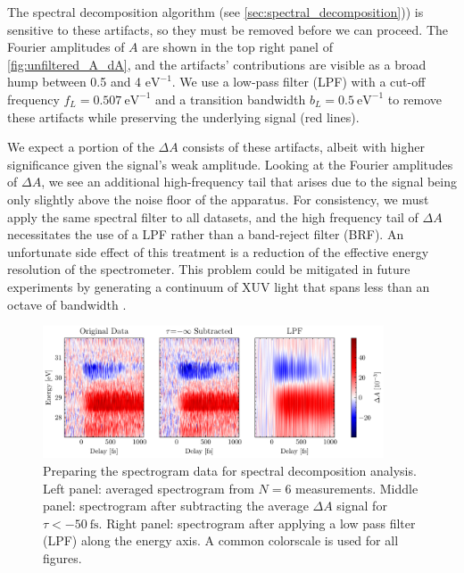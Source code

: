 The spectral decomposition algorithm (see \cref{sec:spectral_decomposition})) is sensitive to these artifacts, so they must be removed before we can proceed. The Fourier amplitudes of $A$ are shown in the top right panel of \cref{fig:unfiltered_A_dA}, and the artifacts' contributions are visible as a broad hump between 0.5 and 4 $\textrm{eV}^{-1}$. We use a low-pass filter (LPF) with a cut-off frequency $f_L = 0.507 \ \textrm{eV}^{-1}$ and a transition bandwidth $b_L = 0.5 \ \textrm{eV}^{-1}$ to remove these artifacts while preserving the underlying signal (red lines).

We expect a portion of the $\Delta A$ consists of these artifacts, albeit with higher significance given the signal's weak amplitude. Looking at the Fourier amplitudes of $\Delta A$, we see an additional high-frequency tail that arises due to the signal being only slightly above the noise floor of the apparatus. For consistency, we must apply the same spectral filter to all datasets, and the high frequency tail of $\Delta A$ necessitates the use of a LPF rather than a band-reject filter (BRF). An unfortunate side effect of this treatment is a reduction of the effective energy resolution of the spectrometer. This problem could be mitigated in future experiments by generating a continuum of XUV light that spans less than an octave of bandwidth \cite{zurchDirectSimultaneousObservation2017}.

\begin{figure}
	\centering
	\includegraphics[width=0.9\textwidth]{figures/chap4/orig_sub_filt_spectrogram.pdf}
	\caption{Preparing the spectrogram data for spectral decomposition analysis. Left panel: averaged spectrogram from $N=6$ measurements. Middle panel: spectrogram after subtracting the average $\Delta A$ signal for $\tau < - 50 \ \textrm{fs}$. Right panel: spectrogram after applying a low pass filter (LPF) along the energy axis. A common colorscale is used for all figures.}
	\label{fig:orig_sub_filt_spectrogram}
\end{figure}

